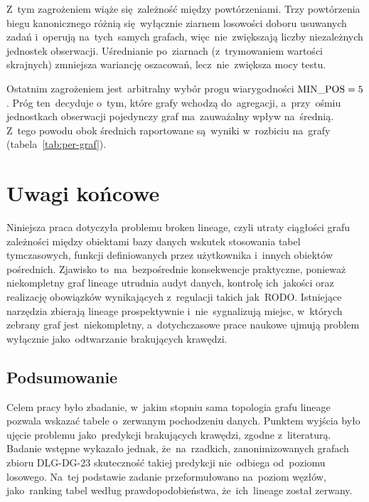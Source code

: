 \documentclass[polish,master,a4paper,oneside]{ppfcmthesis}
\renewcommand{\_}{\origtextunderscore\ifmmode\else\allowbreak\fi}
\begin{document}
Z~tym zagrożeniem wiąże się~zależność między powtórzeniami. Trzy powtórzenia
biegu kanonicznego różnią się~wyłącznie ziarnem losowości doboru usuwanych zadań
i~operują na~tych~samych grafach, więc~nie~zwiększają liczby niezależnych
jednostek obserwacji. Uśrednianie po~ziarnach (z~trymowaniem wartości
skrajnych) zmniejsza wariancję oszacowań, lecz~nie~zwiększa mocy testu.

Ostatnim zagrożeniem jest~arbitralny wybór progu wiarygodności
$\mathrm{MIN\_POS} = 5$. Próg ten~decyduje o~tym, które grafy wchodzą
do~agregacji, a~przy~ośmiu jednostkach obserwacji pojedynczy graf ma~zauważalny
wpływ na~średnią. Z~tego powodu obok średnich raportowane są~wyniki w~rozbiciu
na~grafy (tabela~\ref{tab:per-graf}).

\chapter{Uwagi końcowe}

Niniejsza praca dotyczyła problemu broken lineage, czyli utraty ciągłości
grafu zależności między obiektami bazy danych wskutek stosowania tabel
tymczasowych, funkcji definiowanych przez użytkownika i~innych obiektów
pośrednich. Zjawisko to~ma~bezpośrednie konsekwencje praktyczne, ponieważ
niekompletny graf lineage utrudnia audyt danych, kontrolę ich~jakości oraz
realizację obowiązków wynikających z~regulacji takich jak~RODO. Istniejące
narzędzia zbierają lineage prospektywnie i~nie~sygnalizują miejsc, w~których
zebrany graf jest~niekompletny, a~dotychczasowe prace naukowe ujmują problem
wyłącznie jako~odtwarzanie brakujących krawędzi.


\section{Podsumowanie}
\label{sec:podsumowanie}

Celem pracy było zbadanie, w~jakim stopniu sama topologia grafu lineage
pozwala wskazać tabele o~zerwanym pochodzeniu danych. Punktem wyjścia było
ujęcie problemu jako~predykcji brakujących krawędzi, zgodne z~literaturą.
Badanie wstępne wykazało jednak, że~na~rzadkich, zanonimizowanych grafach
zbioru DLG-DG-23 skuteczność takiej predykcji nie~odbiega od~poziomu losowego.
Na~tej podstawie zadanie przeformułowano na~poziom węzłów, jako~ranking tabel
według prawdopodobieństwa, że~ich~lineage został zerwany.
\end{document}
